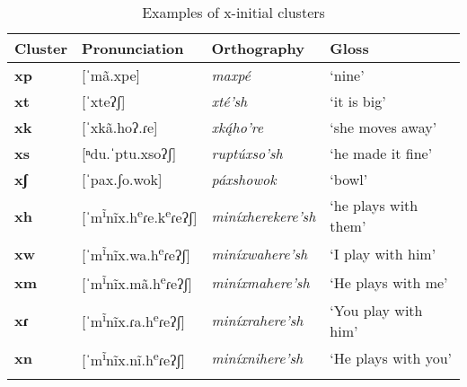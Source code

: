 \begin{table}
\caption{Examples of x-initial clusters}\label{SCexamplesx}
\begin{tabularx}{\textwidth}{lQQl}
\lsptoprule
\textbf{Cluster}&\textbf{Pronunciation}&\textbf{Orthography}&\textbf{Gloss}\\
\midrule
\textbf{xp}&[ˈmã.xpe]&\textit{maxpé}&`nine'\\
\textbf{xt}&[ˈxteʔʃ]&\textit{xté'sh}&`it is big'\\
\textbf{xk}&[ˈxkã.hoʔ.ɾe]&\textit{xką́ho're}&`she moves away'\\
\textbf{xs}&[ⁿdu.ˈptu.xsoʔʃ]&\textit{ruptúxso'sh}&`he made it fine'\\
\textbf{xʃ}&[ˈpax.ʃo.wok]&\textit{páxshowok}&`bowl'\\
\textbf{xh}&[ˈm\textsuperscript{ĩ}nĩx.h\textsuperscript{e}ɾe.k\textsuperscript{e}ɾeʔʃ]&\textit{miníxherekere'sh}&`he plays with them'\\
\textbf{xw}&[ˈm\textsuperscript{ĩ}nĩx.wa.h\textsuperscript{e}ɾeʔʃ]&\textit{miníxwahere'sh}&`I play with him'\\
\textbf{xm}&[ˈm\textsuperscript{ĩ}nĩx.mã.h\textsuperscript{e}ɾeʔʃ]&\textit{miníxmahere'sh}&`He plays with me'\\
\textbf{xɾ}&[ˈm\textsuperscript{ĩ}nĩx.ɾa.h\textsuperscript{e}ɾeʔʃ]&\textit{miníxrahere'sh}&`You play with him'\\
\textbf{xn}&[ˈm\textsuperscript{ĩ}nĩx.nĩ.h\textsuperscript{e}ɾeʔʃ]&\textit{miníxnihere'sh}&`He plays with you'\\
\lspbottomrule
 \end{tabularx}
 \end{table}

